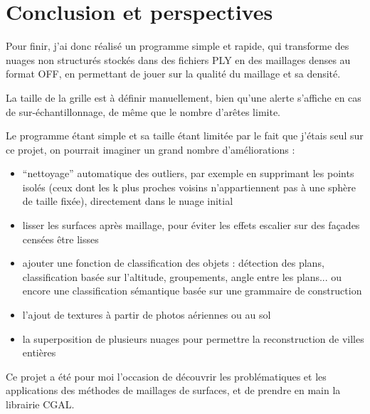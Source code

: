 \newpage
\section*{Conclusion et perspectives}

Pour finir, j'ai donc réalisé un programme simple et rapide, qui transforme des nuages non structurés stockés dans des fichiers PLY en des maillages denses au format OFF, en permettant de jouer sur la qualité du maillage et sa densité.

La taille de la grille est à définir manuellement, bien qu'une alerte s'affiche en cas de sur-échantillonnage, de même que le nombre d'arêtes limite.

Le programme étant simple et sa taille étant limitée par le fait que j'étais seul sur ce projet, on pourrait imaginer un grand nombre d'améliorations :

\begin{itemize}
 \item ``nettoyage'' automatique des outliers, par exemple en supprimant les points isolés (ceux dont les k plus proches voisins n'appartiennent pas à une sphère de taille fixée), directement dans le nuage initial
 \item lisser les surfaces après maillage, pour éviter les effets escalier sur des façades censées être lisses
 \item ajouter une fonction de classification des objets : détection des plans, classification basée sur l'altitude, groupements, angle entre les plans... ou encore une classification sémantique basée sur une grammaire de construction
 \item l'ajout de textures à partir de photos aériennes ou au sol
 \item la superposition de plusieurs nuages pour permettre la reconstruction de villes entières
\end{itemize}

Ce projet a été pour moi l'occasion de découvrir les problématiques et les applications des méthodes de maillages de surfaces, et de prendre en main la librairie CGAL.
